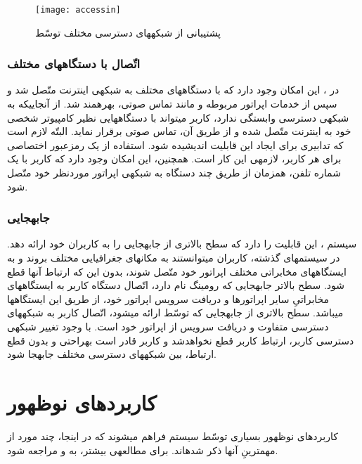 \begin{figure}[h]
\centering
\texttt{[image: accessin]}
\caption{پشتیبانی از شبکه\nf های دسترسی مختلف توسّط }
\label{accessin}
\end{figure}

\subsubsection{اتّصال با دستگاه\nf های مختلف}

در ، این امکان وجود دارد که با دستگاه\nf های مختلف به شبکه\nf ی اینترنت متّصل شد و سپس از خدمات اپراتور مربوطه و  مانند تماس صوتی، بهره\nf مند شد. از آنجایی\nf که  به شبکه\nf ی دسترسی وابستگی ندارد، کاربر می\nf تواند با دستگاه\nf هایی نظیر کامپیوتر شخصی خود به اینترنت متّصل شده و از طریق آن، تماس صوتی برقرار نماید. البتّه لازم است که تدابیری برای ایجاد این قابلیت اندیشیده شود. استفاده از یک رمزعبور اختصاصی برای هر کاربر، لازمه\nf ی این کار است. همچنین، این امکان وجود دارد که کاربر با یک شماره تلفن، هم\nf زمان از طریق چند دستگاه به شبکه\nf ی اپراتور موردنظر خود متّصل شود\cite{3gims}.

\subsubsection{جابه\nf جایی}
سیستم ، این قابلیت را دارد که سطح بالاتری از جابه\nf جایی را به کاربران خود ارائه دهد. در سیستم\nf های گذشته، کاربران می\nf توانستند به مکان\nf های جغرافیایی مختلف بروند و به ایستگاه\nf های مخابراتی مختلف اپراتور خود متّصل شوند، بدون این که ارتباط آن\nf ها قطع شود. سطح بالاتر جابه\nf جایی که رومینگ نام دارد، اتّصال دستگاه کاربر به ایستگاه\nf های مخابراتیِ سایر اپراتورها و دریافت سرویس اپراتور خود، از طریق این ایستگاه\nf ها می\nf باشد. سطح بالاتری از جابه\nf جایی که توسّط  ارائه می\nf شود، اتّصال کاربر به شبکه\nf های دسترسی متفاوت و دریافت سرویس از اپراتور خود است. با وجود تغییر شبکه\nf ی دسترسی کاربر، ارتباط کاربر قطع نخواهدشد و کاربر قادر است به\nf راحتی و بدون قطع ارتباط، بین شبکه\nf های دسترسی مختلف جابه\nf جا شود\cite{blended}.



\section{کاربردهای نوظهور}
کاربردهای نوظهور بسیاری توسّط سیستم  فراهم می\nf شوند که در اینجا، چند مورد از مهم\nf ترینِ آن\nf ها ذکر شده\nf اند. برای مطالعه\nf ی بیشتر، به \cite{blended} و \cite{3gims} مراجعه شود.

